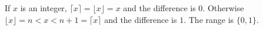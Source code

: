 If $x$ is an integer, $\lceil x\rceil=\lfloor x\rfloor=x$ and the difference is $0$. Otherwise $\lfloor x\rfloor=n<x<n+1=\lceil x\rceil$ and the difference is $1$. The range is $\boxed{\{0,1\}}$.
